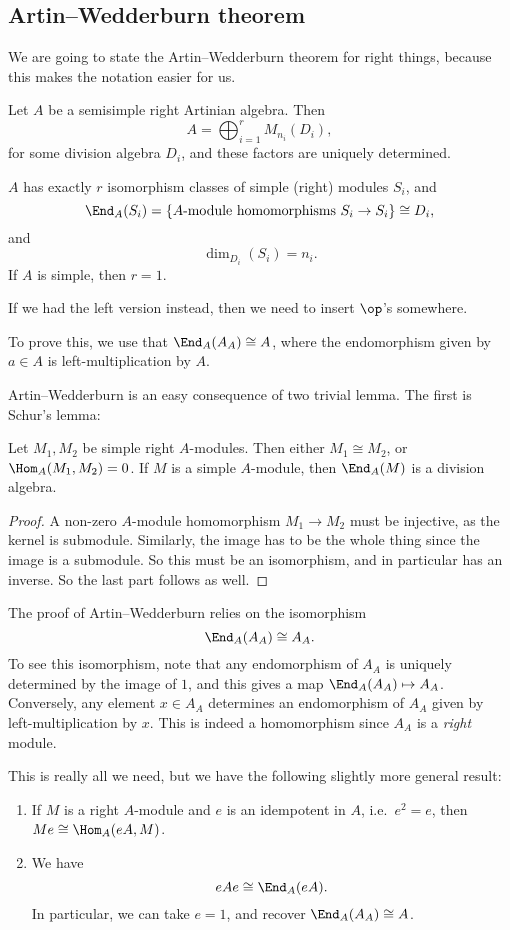 \documentclass[a4paper]{article}
\begin{document}
\subsection{Artin--Wedderburn theorem}
We are going to state the Artin--Wedderburn theorem for right things, because this makes the notation easier for us.
\begin{thm}
  Let $A$ be a semisimple right Artinian algebra. Then
  \[
    A = \bigoplus_{i = 1}^r M_{n_i}(D_i),
  \]
  for some division algebra $D_i$, and these factors are uniquely determined.

  $A$ has exactly $r$ isomorphism classes of simple (right) modules $S_i$, and
  \[
    \End_A (S_i) = \{\text{$A$-module homomorphisms $S_i \to S_i$}\} \cong D_i,
  \]
  and
  \[
    \dim_{D_i}(S_i) = n_i.
  \]
  If $A$ is simple, then $r = 1$.
\end{thm}
If we had the left version instead, then we need to insert $\op$'s somewhere.

To prove this, we use that $\End_A(A_A) \cong A$, where the endomorphism given by $a \in A$ is left-multiplication by $A$.

Artin--Wedderburn is an easy consequence of two trivial lemma. The first is Schur's lemma:
\begin{lemma}
  Let $M_1, M_2$ be simple right $A$-modules. Then either $M_1 \cong M_2$, or $\Hom_A(M_1, M_2) = 0$. If $M$ is a simple $A$-module, then $\End_A(M)$ is a division algebra.
\end{lemma}

\begin{proof}
  A non-zero $A$-module homomorphism $M_1 \to M_2$ must be injective, as the kernel is submodule. Similarly, the image has to be the whole thing since the image is a submodule. So this must be an isomorphism, and in particular has an inverse. So the last part follows as well.
\end{proof}

The proof of Artin--Wedderburn relies on the isomorphism
\[
  \End_A(A_A) \cong A_A.
\]
To see this isomorphism, note that any endomorphism of $A_A$ is uniquely determined by the image of $1$, and this gives a map $\End_A(A_A) \mapsto A_A$. Conversely, any element $x \in A_A$ determines an endomorphism of $A_A$ given by left-multiplication by $x$. This is indeed a homomorphism since $A_A$ is a \emph{right} module.

This is really all we need, but we have the following slightly more general result:
\begin{lemma}\leavevmode
  \begin{enumerate}
    \item If $M$ is a right $A$-module and $e$ is an idempotent in $A$, i.e.\ $e^2 = e$, then $Me \cong \Hom_A(eA, M)$.
    \item We have
      \[
        eAe \cong \End_A(eA).
      \]
      In particular, we can take $e = 1$, and recover $\End_A(A_A) \cong A$.
  \end{enumerate}
\end{lemma}
\end{document}
